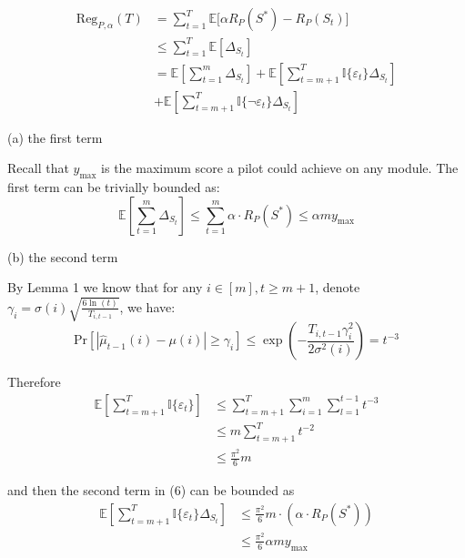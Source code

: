 \documentclass[opre,sglanonrev]{informs4}
\begin{document}
\begin{equation}
    \label{eq:0}
	\begin{aligned}
		  \text{Reg}_{P,\alpha}(T) &= \sum_{t=1}^{T}\mathbb{E}\big[\alpha R_P(S^*) - R_P(S_t)\big]\\
		  &\leq \sum_{t=1}^{T}\mathbb{E}[\Delta_{S_t}]\\
		  &=\mathbb{E}[\sum_{t=1}^{m}\Delta_{S_t}]+\mathbb{E}[\sum_{t=m+1}^{T}\mathbb{I}\{\varepsilon_t\}\Delta_{S_t}]\\
		  &+\mathbb{E}[\sum_{t=m+1}^{T}\mathbb{I}\{\lnot \varepsilon_t\}\Delta_{S_t}]
	\end{aligned}
\end{equation}

(a) the first term 

Recall that $y_{\text{max}}$ is the maximum score a pilot could achieve on any module. The first term can be trivially bounded as:
\begin{equation}
	\mathbb{E}[\sum_{t=1}^{m}\Delta_{S_t}] \leq \sum_{t=1}^{m}\alpha \cdot R_P(S^*) \leq \alpha m y_{\text{max}}
\end{equation}

(b) the second term 

By Lemma 1 we know that for any $i \in [m],t\geq m+1$, denote $\gamma_i = \sigma(i)\sqrt{\frac{6\ln(t)}{T_{i,t-1}}}$, we have:
$$
	\text{Pr}[|\hat{\mu}_{t-1}(i)-\mu(i)|\geq \gamma_i] \leq \exp(-\frac{T_{i,t-1}\gamma_i^2}{2\sigma^2(i)}) = t^{-3}
$$

Therefore
\begin{equation*}
	\begin{aligned}
		\mathbb{E}[\sum_{t=m+1}^{T}\mathbb{I}\{\varepsilon_t\}]
		&\leq \sum_{t=m+1}^{T} \sum_{i=1}^{m} \sum_{l=1}^{t-1}t^{-3} \\
		&\leq m \sum_{t=m+1}^{T}t^{-2} \\
		&\leq \frac{\pi^2}{6}m
	\end{aligned}
\end{equation*}

and then the second term in (6) can be bounded as
\begin{equation}
	\begin{aligned}
		\mathbb{E}[\sum_{t=m+1}^{T}\mathbb{I}\{\varepsilon_t\}\Delta_{S_t}]&\leq \frac{\pi^2}{6}m \cdot (\alpha \cdot R_P(S^*))\\
        &\leq \frac{\pi^2}{6}\alpha m y_{\text{max}}
 	\end{aligned}
\end{equation}
\end{document}
